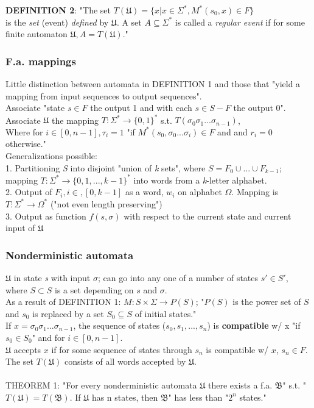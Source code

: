 \textbf{DEFINITION 2}: 
"The set $T(\mathfrak{U}) = \{ x | x \in \Sigma^{*}, M^{*}(s_0, x) \in F \}$ \\
is the \textit{set} (event) \textit{defined} by $\mathfrak{U}$. A set $A \subseteq \Sigma^{*}$ is called a \textit{regular event} if for some finite automaton $\mathfrak{U}, A = T(\mathfrak{U})$."

\subsubsection{F.a. mappings}
Little distinction between automata in DEFINITION 1 and those that "yield a mapping from input sequences to output sequences".\\
Associate "state $s \in F$ the output 1 and with each $s \in S - F$ the output 0".\\
Associate $\mathfrak{U}$ the mapping $T:\Sigma^{*} \to \{ 0, 1 \}^{*}$ s.t. $T(\sigma_{0} \sigma_{1}...\sigma_{n-1})$,\\
Where for $ i \in [0, n-1], \tau_i = 1$ "if $M^{*}(s_0, \sigma_0 ... \sigma_i) \in F$ and and $r_i = 0$ otherwise."\\
 \newpage
Generalizations possible:\\
1. Partitioning \textit{S} into disjoint "union of \textit{k} sets", where $S= F_0 \cup ... \cup F_{k-1}$; mapping $T:\Sigma^{*} \to { \{ 0, 1, ..., k-1 \} }^{*}$
into words from a \textit{k}-letter alphabet.\\
2. Output of $F_i, i \in,[0, k-1]$ as a word, $w_i$ on alphabet $\Omega$.  Mapping is $T:\Sigma^{*} \to \Omega^{*}$ ("not even length preserving")\\
3. Output as function $f(s, \sigma)$ with respect to the current state and current input of $\mathfrak{U}$

\subsubsection{Nonderministic automata}
$\mathfrak{U}$ in state \textit{s} with input $\sigma$; can go into any one of a number of states $s' \in S'$, where $S \subset S$ is a set depending on $s$ and $\sigma$.\\
As a result of DEFINITION 1: $M: S \times \Sigma \to P(S)$; "$P(S)$ is the power set of $S$ and $s_0$ is replaced by a set $S_0 \subseteq S$ of initial states."\\
If $x=\sigma_0 \sigma_1 ... \sigma_{n-1}$, the sequence of states ($s_0, s_1, ..., s_n$) is \textbf{compatible} w/ x "if $s_0 \in S_0$" and for $i \in [0, n-1]$.\\
$\mathfrak{U}$ accepts $x$ if for some sequence of states through $s_n$ is compatible w/ $x$, $s_n \in F$.\\
The set $T(\mathfrak{U})$ consists of all words accepted by $\mathfrak{U}$.\\
\\
THEOREM 1: "For every nonderministic automata $\mathfrak{U}$ there exists a f.a. $\mathfrak{B}$" s.t. "$T(\mathfrak{U}) = T(\mathfrak{B})$. 
If $\mathfrak{U}$ has n states, then $\mathfrak{B}$" has less than "$2^n$ states." %


